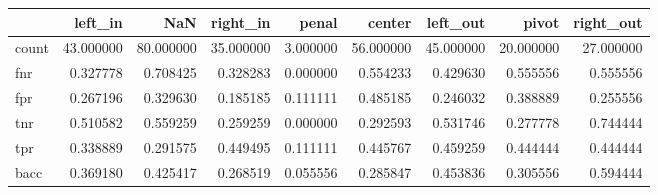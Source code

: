 \begin{tabular}{lrrrrrrrr}
\toprule
{} &    left\_in &        NaN &   right\_in &     penal &     center &   left\_out &      pivot &  right\_out \\
\midrule
count &  43.000000 &  80.000000 &  35.000000 &  3.000000 &  56.000000 &  45.000000 &  20.000000 &  27.000000 \\
fnr   &   0.327778 &   0.708425 &   0.328283 &  0.000000 &   0.554233 &   0.429630 &   0.555556 &   0.555556 \\
fpr   &   0.267196 &   0.329630 &   0.185185 &  0.111111 &   0.485185 &   0.246032 &   0.388889 &   0.255556 \\
tnr   &   0.510582 &   0.559259 &   0.259259 &  0.000000 &   0.292593 &   0.531746 &   0.277778 &   0.744444 \\
tpr   &   0.338889 &   0.291575 &   0.449495 &  0.111111 &   0.445767 &   0.459259 &   0.444444 &   0.444444 \\
bacc  &   0.369180 &   0.425417 &   0.268519 &  0.055556 &   0.285847 &   0.453836 &   0.305556 &   0.594444 \\
\bottomrule
\end{tabular}
